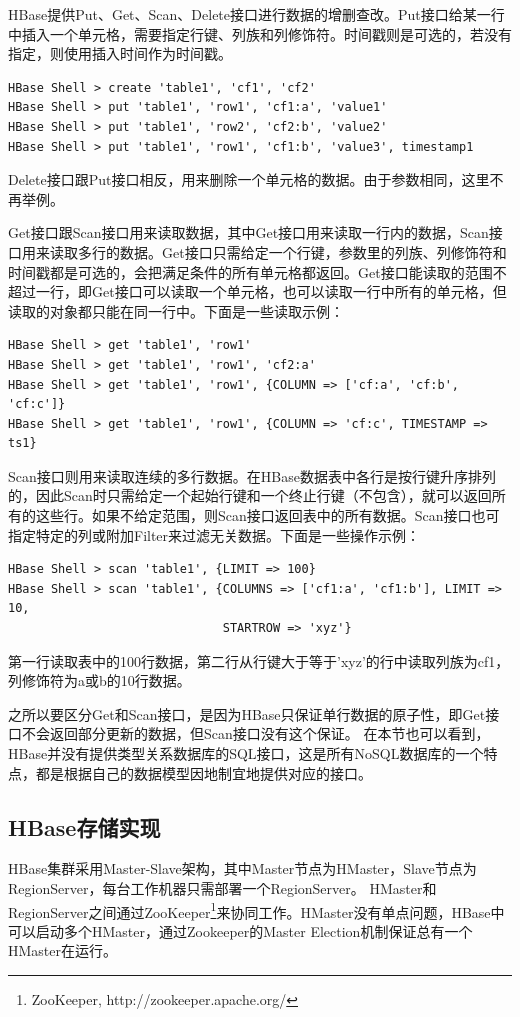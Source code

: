 HBase提供Put、Get、Scan、Delete接口进行数据的增删查改。Put接口给某一行中插入一个单元格，需要指定行键、列族和列修饰符。时间戳则是可选的，若没有指定，则使用插入时间作为时间戳。
\begin{verbatim}
HBase Shell > create 'table1', 'cf1', 'cf2'
HBase Shell > put 'table1', 'row1', 'cf1:a', 'value1'
HBase Shell > put 'table1', 'row2', 'cf2:b', 'value2'
HBase Shell > put 'table1', 'row1', 'cf1:b', 'value3', timestamp1
\end{verbatim}

Delete接口跟Put接口相反，用来删除一个单元格的数据。由于参数相同，这里不再举例。

Get接口跟Scan接口用来读取数据，其中Get接口用来读取一行内的数据，Scan接口用来读取多行的数据。Get接口只需给定一个行键，参数里的列族、列修饰符和时间戳都是可选的，会把满足条件的所有单元格都返回。Get接口能读取的范围不超过一行，即Get接口可以读取一个单元格，也可以读取一行中所有的单元格，但读取的对象都只能在同一行中。下面是一些读取示例：
\begin{verbatim}
HBase Shell > get 'table1', 'row1'
HBase Shell > get 'table1', 'row1', 'cf2:a'
HBase Shell > get 'table1', 'row1', {COLUMN => ['cf:a', 'cf:b', 'cf:c']}
HBase Shell > get 'table1', 'row1', {COLUMN => 'cf:c', TIMESTAMP => ts1}
\end{verbatim}

Scan接口则用来读取连续的多行数据。在HBase数据表中各行是按行键升序排列的，因此Scan时只需给定一个起始行键和一个终止行键（不包含），就可以返回所有的这些行。如果不给定范围，则Scan接口返回表中的所有数据。Scan接口也可指定特定的列或附加Filter来过滤无关数据。下面是一些操作示例：
\begin{verbatim}
HBase Shell > scan 'table1', {LIMIT => 100}
HBase Shell > scan 'table1', {COLUMNS => ['cf1:a', 'cf1:b'], LIMIT => 10,
                              STARTROW => 'xyz'}
\end{verbatim}
第一行读取表中的100行数据，第二行从行键大于等于'xyz'的行中读取列族为cf1，列修饰符为a或b的10行数据。

之所以要区分Get和Scan接口，是因为HBase只保证单行数据的原子性，即Get接口不会返回部分更新的数据，但Scan接口没有这个保证。
在本节也可以看到，HBase并没有提供类型关系数据库的SQL接口，这是所有NoSQL数据库的一个特点，都是根据自己的数据模型因地制宜地提供对应的接口。


\subsection{HBase存储实现}
HBase集群采用Master-Slave架构，其中Master节点为HMaster，Slave节点为RegionServer，每台工作机器只需部署一个RegionServer。
HMaster和RegionServer之间通过ZooKeeper\footnote{ZooKeeper, http://zookeeper.apache.org/}来协同工作。HMaster没有单点问题，HBase中可以启动多个HMaster，通过Zookeeper的Master Election机制保证总有一个HMaster在运行。

